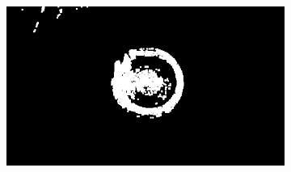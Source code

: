 \documentclass{article}
\begin{document}
\begin{figure}[H]
\begin{subfigure}{.47\textwidth}
  \centering
  \includegraphics[width=0.97\linewidth]{_Figures/raw_data_1_opening.png}
  \caption{}
  \label{fig:raw_1_opening}
\end{subfigure}


\end{figure}
\end{document}
